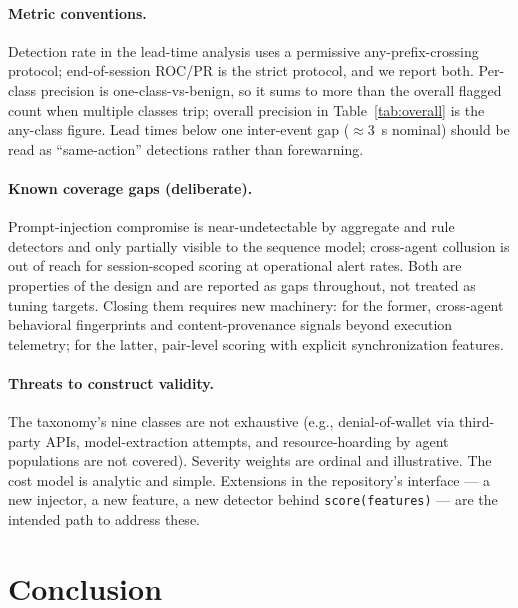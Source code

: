 \documentclass[10pt]{article}
\newcommand{\code}[1]{\texttt{#1}}
\begin{document}
\paragraph{Metric conventions.} Detection rate in the lead-time analysis uses
a permissive any-prefix-crossing protocol; end-of-session ROC/PR is the strict
protocol, and we report both. Per-class precision is one-class-vs-benign, so
it sums to more than the overall flagged count when multiple classes trip;
overall precision in Table~\ref{tab:overall} is the any-class figure. Lead
times below one inter-event gap ($\approx$3~s nominal) should be read as
``same-action'' detections rather than forewarning.

\paragraph{Known coverage gaps (deliberate).} Prompt-injection compromise is
near-undetectable by aggregate and rule detectors and only partially visible
to the sequence model; cross-agent collusion is out of reach for session-scoped
scoring at operational alert rates. Both are properties of the design and are
reported as gaps throughout, not treated as tuning targets. Closing them
requires new machinery: for the former, cross-agent behavioral fingerprints
and content-provenance signals beyond execution telemetry; for the latter,
pair-level scoring with explicit synchronization features.

\paragraph{Threats to construct validity.} The taxonomy's nine classes are not
exhaustive (e.g., denial-of-wallet via third-party APIs, model-extraction
attempts, and resource-hoarding by agent populations are not covered). Severity
weights are ordinal and illustrative. The cost model is analytic and simple.
Extensions in the repository's interface --- a new injector, a new feature, a
new detector behind \code{score(features)} --- are the intended path to
address these.

\section{Conclusion}
\label{sec:conclusion}
\end{document}
